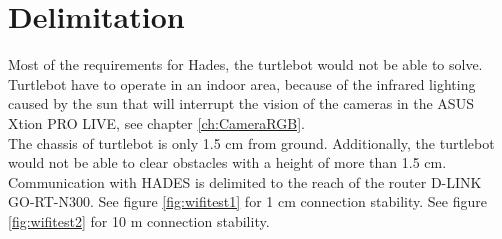 \chapter{Delimitation} \label{ch:Delimitation}
Most of the requirements for Hades, the turtlebot would not be able to solve. Turtlebot have to operate in an indoor area, because of the infrared lighting caused by the sun that will interrupt the vision of the cameras in the ASUS Xtion PRO LIVE, see chapter \ref{ch:CameraRGB}.\\
The chassis of turtlebot is only 1.5 cm from ground. Additionally, the turtlebot would not be able to clear obstacles with a height of more than 1.5 cm.\\
Communication with HADES is delimited to the reach of the router D-LINK GO-RT-N300.
See figure \ref{fig:wifitest1} for 1 cm connection stability.
See figure \ref{fig:wifitest2} for 10 m connection stability.




